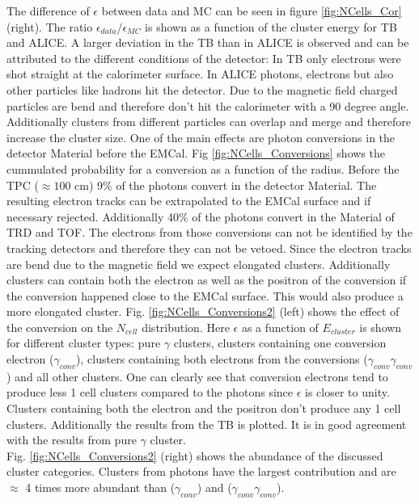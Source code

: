 \documentclass[ALICE]{ALICE_analysis_notes}
\begin{document}
The difference of $\epsilon$ between data and MC can be seen in figure \ref{fig:NCells_Cor} (right). The ratio $\epsilon_{data}/\epsilon_{MC}$ is shown as a function of the cluster energy for TB and ALICE. A larger deviation in the TB than in ALICE is observed and can be attributed to the different conditions of the detector: In TB only electrons were shot straight at the calorimeter surface. In ALICE photons, electrons but also other particles like hadrons hit the detector. Due to the magnetic field charged particles are bend and therefore don't hit the calorimeter with a 90 degree angle. Additionally clusters from different particles can overlap and merge and therefore increase the cluster size. One of the main effects are photon conversions in the detector Material before the EMCal. Fig \ref{fig:NCells_Conversions} shows the cummulated  probability for a conversion as a function of the radius. Before the TPC ($\approx 100$ cm) 9\% of the photons convert in the detector Material. The resulting electron tracks can be extrapolated to the EMCal surface and if necessary rejected.  Additionally 40\% of the photons convert in the Material of TRD and TOF. The electrons from those conversions can not be identified by the tracking detectors and therefore they can not be vetoed. Since the electron tracks are bend due to the magnetic field we expect elongated clusters. Additionally clusters can contain both the electron as well as the positron of the conversion if the conversion happened close to the EMCal surface. This would also produce a more elongated cluster. Fig. \ref{fig:NCells_Conversions2} (left) shows the effect of the conversion on the $N_{cell}$ distribution. Here $\epsilon$ as a function of $E_{cluster}$ is shown for different cluster types: pure $\gamma$ clusters, clusters containing one conversion electron ($\gamma_{conv}$), clusters containing both electrons from the conversions ($\gamma_{conv}\gamma_{conv}$) and all other clusters. One can clearly see that conversion electrons tend to produce less 1 cell clusters compared to the photons since $\epsilon$ is closer to unity. Clusters containing both the electron and the positron don't produce any 1 cell clusters. Additionally the results from the TB is plotted. It is in good agreement with the results from pure $\gamma$ cluster.\\
Fig. \ref{fig:NCells_Conversions2} (right) shows the abundance of the discussed cluster categories. Clusters from photons have the largest contribution and are $\approx$ 4 times more abundant than ($\gamma_{conv}$) and ($\gamma_{conv}\gamma_{conv}$).\\
\end{document}
